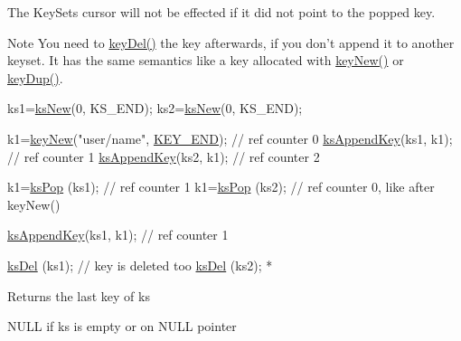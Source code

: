 The Key\-Sets cursor will not be effected if it did not point to the popped key.

\begin{DoxyNote}{Note}
You need to \hyperlink{group__key_ga3df95bbc2494e3e6703ece5639be5bb1}{key\-Del()} the key afterwards, if you don't append it to another keyset. It has the same semantics like a key allocated with \hyperlink{group__key_gad23c65b44bf48d773759e1f9a4d43b89}{key\-New()} or \hyperlink{group__key_gae6ec6a60cc4b8c1463fa08623d056ce3}{key\-Dup()}.
\end{DoxyNote}

\begin{DoxyCode}
ks1=\hyperlink{group__keyset_ga671e1aaee3ae9dc13b4834a4ddbd2c3c}{ksNew}(0, KS\_END);
ks2=\hyperlink{group__keyset_ga671e1aaee3ae9dc13b4834a4ddbd2c3c}{ksNew}(0, KS\_END);

k1=\hyperlink{group__key_gad23c65b44bf48d773759e1f9a4d43b89}{keyNew}(\textcolor{stringliteral}{"user/name"}, \hyperlink{group__key_gga91fb3178848bd682000958089abbaf40aa8adb6fcb92dec58fb19410eacfdd403}{KEY\_END}); \textcolor{comment}{// ref counter 0}
\hyperlink{group__keyset_gaa5a1d467a4d71041edce68ea7748ce45}{ksAppendKey}(ks1, k1); \textcolor{comment}{// ref counter 1}
\hyperlink{group__keyset_gaa5a1d467a4d71041edce68ea7748ce45}{ksAppendKey}(ks2, k1); \textcolor{comment}{// ref counter 2}

k1=\hyperlink{group__keyset_gae42530b04defb772059de0600159cf69}{ksPop} (ks1); \textcolor{comment}{// ref counter 1}
k1=\hyperlink{group__keyset_gae42530b04defb772059de0600159cf69}{ksPop} (ks2); \textcolor{comment}{// ref counter 0, like after keyNew()}

\hyperlink{group__keyset_gaa5a1d467a4d71041edce68ea7748ce45}{ksAppendKey}(ks1, k1); \textcolor{comment}{// ref counter 1}

\hyperlink{group__keyset_ga27e5c16473b02a422238c8d970db7ac8}{ksDel} (ks1); \textcolor{comment}{// key is deleted too}
\hyperlink{group__keyset_ga27e5c16473b02a422238c8d970db7ac8}{ksDel} (ks2);
 *
\end{DoxyCode}


\begin{DoxyReturn}{Returns}
the last key of {\ttfamily ks} 

N\-U\-L\-L if {\ttfamily ks} is empty or on N\-U\-L\-L pointer 
\end{DoxyReturn}

